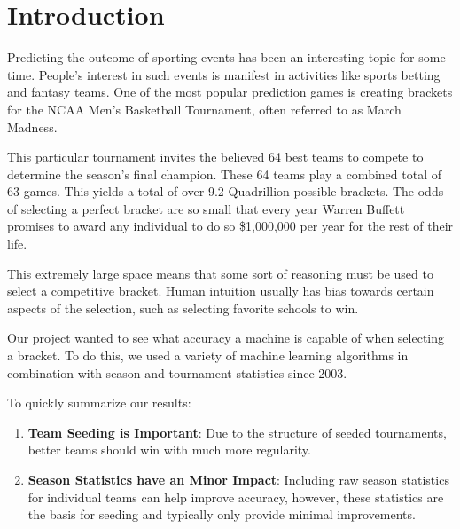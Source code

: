 \section{Introduction}

Predicting the outcome of sporting events has been an interesting topic for some time.
People's interest in such events is manifest in activities like sports betting and fantasy teams.
One of the most popular prediction games is creating brackets for the NCAA Men's Basketball Tournament, often referred to as March Madness.

This particular tournament invites the believed 64 best teams to compete to determine the season's final champion.
These 64 teams play a combined total of 63 games.
This yields a total of over 9.2 Quadrillion possible brackets.
The odds of selecting a perfect bracket are so small that every year Warren Buffett promises to award any individual to do so \$1,000,000 per year for the rest of their life.

This extremely large space means that some sort of reasoning must be used to select a competitive bracket.
Human intuition usually has bias towards certain aspects of the selection, such as selecting  favorite schools to win.

Our project wanted to see what accuracy a machine is capable of when selecting a bracket.
To do this, we used a variety  of machine learning algorithms in combination with season and tournament statistics since 2003.

To quickly summarize our results:
\begin{enumerate}
	\item \textbf{Team Seeding is Important}: Due to the structure of seeded tournaments, better teams should win with much more regularity.
	\item \textbf{Season Statistics have an Minor Impact}: Including raw season statistics for individual teams can help improve accuracy, however, these statistics are the basis for seeding and typically only provide minimal improvements.
\end{enumerate}